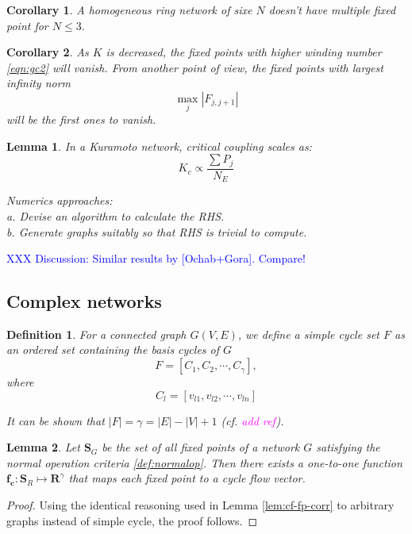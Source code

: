 \documentclass[10pt,aps,pra,onecolumn,superscriptaddress]{revtex4-1}
\newcommand{\dirk}[1]{\textcolor{blue}{#1}}
\newcommand{\debsankha}[1]{\textcolor{magenta}{#1}}
\newtheorem{defn}[thm]{Definition}
\renewcommand{\vec}[1]{\boldsymbol{#1}}
\newtheorem{lemma}{Lemma}
\newtheorem{corr}{Corollary}
\begin{document}
\begin{corr}
\label{corr:nomult-3}
A homogeneous ring network of sixe $N$ doesn't have multiple fixed point for 
$N\leq 3$.  
\end{corr}

\begin{corr}
As $K$ is decreased, the fixed points with higher \emph{winding number} 
\eqref{eqn:gc2} will vanish. From another point of view, the fixed points with 
largest infinity norm
\[
\max_j\left|F_{j,j+1}\right|
\]
will be the first ones to vanish.  
\end{corr} 

\begin{lemma}
In a Kuramoto network, critical coupling scales as:
\[
K_c\propto \frac{\sum P_j}{N_E}
\]

Numerics approaches: \\
a. Devise an algorithm to calculate the RHS.   \\
b. Generate graphs suitably so that RHS is trivial to compute.  
\end{lemma}



\dirk{XXX Discussion: Similar results by [Ochab+Gora]. Compare!
}

\subsection{Complex networks}

\begin{defn}
For a connected  graph $G(V,E)$, we define a \emph{simple cycle set} $F$ as an 
ordered set containing the basis cycles of $G$
\[
F=\left[C_1, C_2,\cdots, C_{\gamma} \right],
\]
where 
\[
C_l=\left[v_{l1},v_{l2},\cdots, v_{ln}\right]
\]


It can be shown that 
$|F|=\gamma=|E|-|V|+1$ (cf. \debsankha{add ref}).  
\end{defn}


\begin{lemma}
\label{lem:cf-fp-corr-planar}
Let $\mathbf{S}_G$ be the set of all fixed points of a network $G$ 
satisfying the normal operation criteria \eqref{def:normalop}.
Then there exists a one-to-one function $\vec{f_c}:\mathbf{S}_R\mapsto \mathbf{R}^{\gamma}$ 
that maps each fixed point to a \emph{cycle flow vector}.  

\end{lemma}
\begin{proof}
Using the identical reasoning used in Lemma \ref{lem:cf-fp-corr} to arbitrary 
graphs instead of simple cycle, the proof follows.  
\end{proof}
\end{document}
